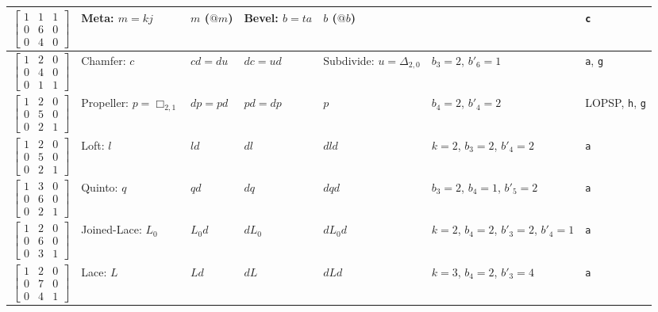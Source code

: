 \documentclass{amsart}[12pt]
\begin{document}
\begin{longtable}{c|m{2cm}|m{2cm}|m{2cm}|m{2cm}|m{1.7cm}|m{2.5cm}}
    \\ \hline
    $\begin{bmatrix}
    1 & 1 & 1 \\
    0 & 6 & 0 \\
    0 & 4 & 0 \end{bmatrix}$& Meta: ${m=kj}$ & $m$ ($@m$) & Bevel: ${b=ta}$ & $b$ ($@b$) & &\texttt{c}
    \\ \hline
    $\begin{bmatrix}
    1 & 2 & 0 \\
    0 & 4 & 0 \\
    0 & 1 & 1 \end{bmatrix}$& Chamfer: $c$ & $cd=du$ & $dc=ud$ & Subdivide: ${u =\Delta_{2,0}}$ & ${b_3=2}$, ${b'_6=1}$ &\texttt{a}, \texttt{g}
    \\ \hline
    $\begin{bmatrix}
    1 & 2 & 0 \\
    0 & 5 & 0 \\
    0 & 2 & 1 \end{bmatrix}$& Propeller: ${p=\Box_{2,1}}$ & $dp=pd$ & $pd=dp$ & $p$ & ${b_4=2}$, ${b'_4=2}$ &LOPSP, \texttt{h}, \texttt{g}
    \\ \hline
    $\begin{bmatrix}
    1 & 2 & 0 \\
    0 & 5 & 0 \\
    0 & 2 & 1 \end{bmatrix}$& Loft: $l$ & $ld$ & $dl$ & $dld$ & ${k=2}$, ${b_3=2}$, ${b'_4=2}$ &\texttt{a}
    \\ \hline
    $\begin{bmatrix}
    1 & 3 & 0 \\
    0 & 6 & 0 \\
    0 & 2 & 1 \end{bmatrix}$& Quinto: $q$ & $qd$ & $dq$ & $dqd$ & ${b_3=2}$, ${b_4=1}$, ${b'_5=2}$ &\texttt{a}
    \\ \hline
    $\begin{bmatrix}
    1 & 2 & 0 \\
    0 & 6 & 0 \\
    0 & 3 & 1 \end{bmatrix}$& Joined-Lace: $L_0$ & $L_0d$ & $dL_0$ & $dL_0d$
    & ${k=2}$, ${b_4=2}$, ${b'_3=2}$, ${b'_4=1}$ &\texttt{a}
    \\ \hline
    $\begin{bmatrix}
    1 & 2 & 0 \\
    0 & 7 & 0 \\
    0 & 4 & 1 \end{bmatrix}$& Lace: $L$ & $Ld$ & $dL$ & $dLd$ & ${k=3}$, ${b_4=2}$, ${b'_3=4}$&\texttt{a}

\end{longtable}
\end{document}
